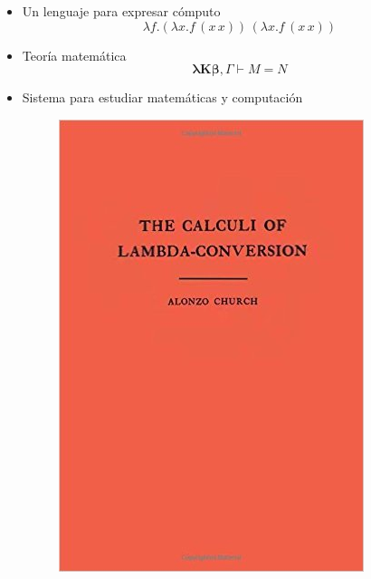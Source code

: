 \documentclass[pdf]{beamer}
\newcommand{\bs}{\boldsymbol}
\begin{document}
\begin{frame}
  \begin{itemize}
  \item<2-> \alert<2>{Un lenguaje para expresar cómputo}
    \[ λf.(λx.f\, (x\, x))\, (λx.f\, (x\, x)) \]
  \item<3-> \alert<3>{Teoría matemática}
    \[ \bs{λKβ}, Γ \vdash M = N \]
  \item<4-> \alert<4>{Sistema para estudiar matemáticas y computación}
    \begin{figure}[!tbp]
      \centering
      \begin{minipage}[b]{0.15\textwidth}
        \includegraphics[width=\textwidth]{libro-church.jpg}
      \end{minipage}
      \hfill
      \begin{minipage}[b]{0.15\textwidth}

\end{minipage}
\end{figure}
\end{itemize}
\end{frame}
\end{document}
